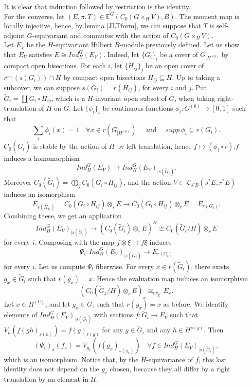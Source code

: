 \begin{dem} It is clear that induction followed by restriction is the identity.\\ 

For the converse, let $(E,\pi,T)\in \mathbb E^G(C_0(G\times_H V),B)$. The moment map is locally injective, hence, by lemma \ref{JLTform}, we can suppose that $T$ is self-adjoint $G$-equivariant and commutes with the action of $C_0(G\times_H V)$.\\

Let $E_V$ be the $H$-equivariant Hilbert $B$-module previously defined. Let us show that $E_{V}$ satisfies $E\cong Ind_H^G (E_V)$. Indeed, let $\{G_i\}_i$ be a cover of $G_{|H^{(0)}}$ by compact open bisections. For each $i$, let $\{H_{ij}\}_j$ be an open cover of $r^{-1}( s(G_i))\cap H$ by compact open bisections $H_{ij} \subseteq H$. Up to taking a subcover, we can suppose $s(G_i) = r(H_{ij})$, for every $i$ and $j$. Put $\tilde G_i = \coprod G_i \circ H_{ij}$, which is a $H$-invariant open subset of $G$, when taking right-translation of $H$ on $G$. Let $\{\phi_i\}_i$ be continuous functions $\phi_i : G^{(0)}\rightarrow [0,1]$ such that 
\[\sum_{i} \phi_i(x) = 1\quad \forall x\in r(G_{|H^{(0)}}) \quad \text{ and } \quad supp \ \phi_i\subseteq r(G_i) .\]
$C_0(\tilde G_i)$ is stable by the action of $H$ by left translation, hence $f\mapsto (\phi_i\circ r) . f$ induces a homomorphism 
\[Ind_H^G(E_V) \rightarrow Ind_H^G(E_V)_{|s(\tilde G_i)} .\] 
Moreover $C_0(\tilde G_i) = \bigoplus_j C_0(G_i\circ H_{ij})$, and the action $V\in \mathcal L_{s^*B}(s^* E, r^* E)$ induces an isomorphism
\[ E_{s(H_{ij})}=C_0(G_i\circ H_{ij})\otimes_s E \rightarrow C_0(G_i\circ H_{ij})\otimes_r E = E_{r(G_{i})}. \]
Combining these, we get an application 
\[ Ind_H^G(E_V)_{|s(\tilde G_i)} \rightarrow (C_0(\tilde G_i)\otimes_r E)^H \cong C_0(\tilde G_i/H)\otimes_r E \]
for every $i$. Composing with the map $f\otimes \xi \mapsto f\xi$ induces
\[\Psi_i : Ind_H^G(E_V)_{|s(\tilde G_i)} \rightarrow E_{r(G_i)}\]
for every $i$. 
Let us compute $\Psi_i$ fiberwise. For every $x\in r(\tilde G_i)$, there exists $g_x\in \tilde G_i$ such that $r(g_x)=x$. Hence the evaluation map induces an isomorphism 
\[\left( C_0(\tilde G_j / H) \otimes_r E \right)_x \cong_{ev_{g_i^x}} E_x.\] 
Let $x\in H^{(0)}$, and let $g_x \in \tilde G_i$ such that $r(g_x) = x$ as before. We identify elements of $Ind_H^G(E_V)_{|s(\tilde G_i)}$ with sections $f : \tilde G_i \rightarrow E_V$ such that $V_h(f(gh)_{s(h)})= f(g)_{r(g)}$ for any $g\in \tilde G_i$ and any $h\in H^{s(g)}$. Then 
\[ (\Psi_i)_x(f_x) = V_{g_x}\left( f(g_{x})_{s(g_x)} \right)\quad \forall f\in Ind_H^G(E_V)_{|s(\tilde G_i)}, \]
which is an isomorphism. Notice that, by the $H$-equivariance of $f$, this last identity does not depend on the $g_x$ chosen, because they all differ by a right translation by an element in $H$. \\


\end{dem}
